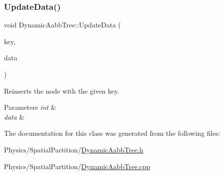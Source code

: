 \subsubsection{\texorpdfstring{Update\+Data()}{UpdateData()}}
{\footnotesize\ttfamily void Dynamic\+Aabb\+Tree\+::\+Update\+Data (\begin{DoxyParamCaption}\item[{unsigned int \&}]{key,  }\item[{const \hyperlink{classSpatialPartitionData}{Spatial\+Partition\+Data} \&}]{data }\end{DoxyParamCaption})}



Reinserts the node with the given key. 


\begin{DoxyParams}{Parameters}
{\em int} & \\
\hline
{\em data} & \\
\hline
\end{DoxyParams}


The documentation for this class was generated from the following files\+:\begin{DoxyCompactItemize}
\item 
Physics/\+Spatial\+Partition/\hyperlink{DynamicAabbTree_8h}{Dynamic\+Aabb\+Tree.\+h}\item 
Physics/\+Spatial\+Partition/\hyperlink{DynamicAabbTree_8cpp}{Dynamic\+Aabb\+Tree.\+cpp}\end{DoxyCompactItemize}
